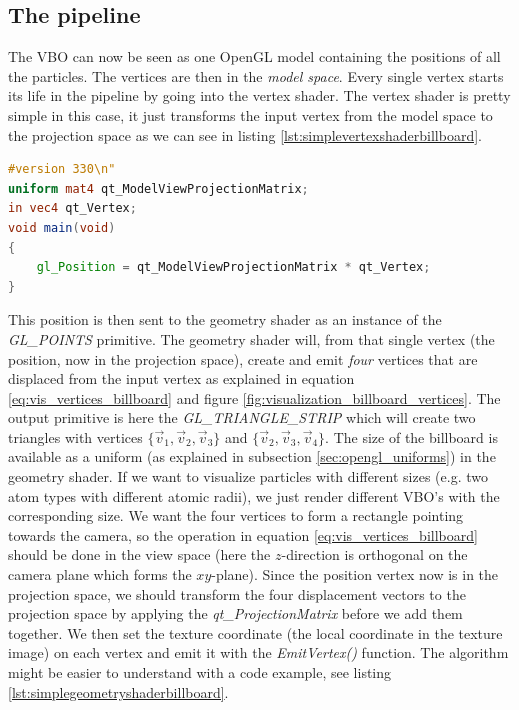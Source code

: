 \subsection{The pipeline}
The VBO can now be seen as one OpenGL model containing the positions of all the particles. The vertices are then in the \textit{model space}. Every single vertex starts its life in the pipeline by going into the vertex shader. The vertex shader is pretty simple in this case, it just transforms the input vertex from the model space to the projection space as we can see in listing \ref{lst:simplevertexshaderbillboard}.
\begin{lstlisting}[caption=billboardVertexShader.glsl, label=lst:simplevertexshaderbillboard, language=GLSL]
#version 330\n"
uniform mat4 qt_ModelViewProjectionMatrix;
in vec4 qt_Vertex;
void main(void)
{
    gl_Position = qt_ModelViewProjectionMatrix * qt_Vertex;
}
\end{lstlisting}
This position is then sent to the geometry shader as an instance of the \textit{GL\_POINTS} primitive. The geometry shader will, from that single vertex (the position, now in the projection space), create and emit \textit{four} vertices that are displaced from the input vertex as explained in equation \eqref{eq:vis_vertices_billboard} and figure \ref{fig:visualization_billboard_vertices}. The output primitive is here the \textit{GL\_TRIANGLE\_STRIP} which will create two triangles with vertices $\{\vec v_1, \vec v_2, \vec v_3\}$ and $\{\vec v_2, \vec v_3, \vec v_4\}$. The size of the billboard is available as a uniform (as explained in subsection \ref{sec:opengl_uniforms}) in the geometry shader. If we want to visualize particles with different sizes (e.g. two atom types with different atomic radii), we just render different VBO's with the corresponding size. We want the four vertices to form a rectangle pointing towards the camera, so the operation in equation \eqref{eq:vis_vertices_billboard} should be done in the view space (here the $z$-direction is orthogonal on the camera plane which forms the $xy$-plane). Since the position vertex now is in the projection space, we should transform the four displacement vectors to the projection space by applying the \textit{qt\_ProjectionMatrix} before we add them together. We then set the texture coordinate (the local coordinate in the texture image) on each vertex and emit it with the \textit{EmitVertex()} function. The algorithm might be easier to understand with a code example, see listing \ref{lst:simplegeometryshaderbillboard}.

